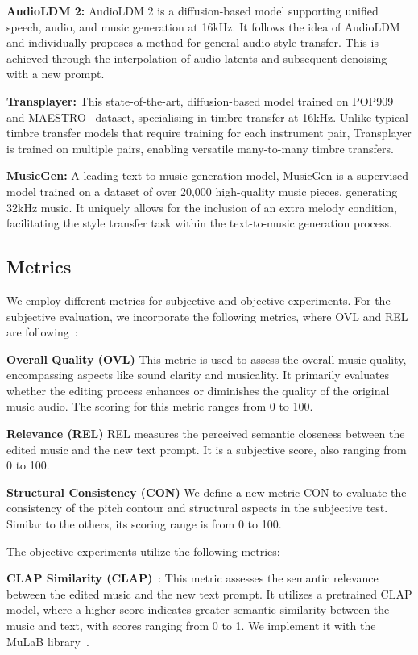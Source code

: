 \noindent\textbf{AudioLDM 2:} AudioLDM 2 is a diffusion-based model supporting unified speech, audio, and music generation at 16kHz. It follows the idea of AudioLDM and individually proposes a method for general audio style transfer. This is achieved through the interpolation of audio latents and subsequent denoising with a new prompt.

\noindent\textbf{Transplayer:} This state-of-the-art, diffusion-based model trained on POP909~\cite{pop909} and MAESTRO~\cite{maestro} dataset, specialising in timbre transfer at 16kHz. Unlike typical timbre transfer models that require training for each instrument pair, Transplayer is trained on multiple pairs, enabling versatile many-to-many timbre transfers.

\noindent\textbf{MusicGen:} A leading text-to-music generation model, MusicGen is a supervised model trained on a dataset of over 20,000 high-quality music pieces, generating 32kHz music. It uniquely allows for the inclusion of an extra melody condition, facilitating the style transfer task within the text-to-music generation process.

\subsection{Metrics}

We employ different metrics for subjective and objective experiments. For the subjective evaluation, we incorporate the following metrics, where OVL and REL are following~\cite{audiogen}:

\noindent\textbf{Overall Quality (OVL)} This metric is used to assess the overall music quality, encompassing aspects like sound clarity and musicality. It primarily evaluates whether the editing process enhances or diminishes the quality of the original music audio. The scoring for this metric ranges from 0 to 100.

\noindent\textbf{Relevance (REL)} REL measures the perceived semantic closeness between the edited music and the new text prompt. It is a subjective score, also ranging from 0 to 100.

\noindent\textbf{Structural Consistency (CON)} We define a new metric CON to evaluate the consistency of the pitch contour and structural aspects in the subjective test. Similar to the others, its scoring range is from 0 to 100.

The objective experiments utilize the following metrics:

\noindent\textbf{CLAP Similarity (CLAP)}~\cite{clap}: This metric assesses the semantic relevance between the edited music and the new text prompt. It utilizes a pretrained CLAP model, where a higher score indicates greater semantic similarity between the music and text, with scores ranging from 0 to 1. We implement it with the MuLaB library~\cite{mulab}.

